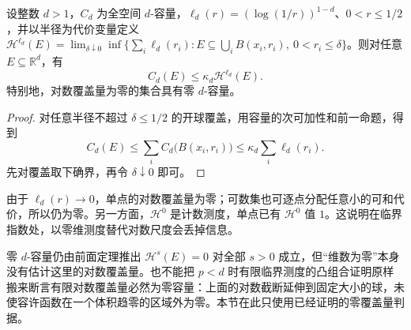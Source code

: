 \begin{corollary}\label{b1:cor:logarithmic-cover-zero-capacity}
设整数 \(d>1\)，\(C_d\) 为全空间 \(d\)-容量，\(\ell_d(r)=(\log(1/r))^{1-d}\)、\(0<r\leq1/2\)，并以半径为代价变量定义 \(\mathcal H^{\ell_d}(E)=\lim_{\delta\downarrow0}\inf\{\sum_i\ell_d(r_i):E\subseteq\bigcup_iB(x_i,r_i),\ 0<r_i\leq\delta\}\)。则对任意 \(E\subseteq\mathbb R^d\)，有
\[
 C_d(E)\leq\kappa_d\mathcal H^{\ell_d}(E).
\]
特别地，对数覆盖量为零的集合具有零 \(d\)-容量。
\end{corollary}
\begin{proof}
对任意半径不超过 \(\delta\leq1/2\) 的开球覆盖，用容量的次可加性和前一命题，得到
\[
 C_d(E)\leq\sum_iC_d\bigl(B(x_i,r_i)\bigr)
 \leq\kappa_d\sum_i\ell_d(r_i).
\]
先对覆盖取下确界，再令 \(\delta\downarrow0\) 即可。
\end{proof}

由于 \(\ell_d(r)\to0\)，单点的对数覆盖量为零；可数集也可逐点分配任意小的可和代价，所以仍为零。另一方面，\(\mathcal H^0\) 是计数测度，单点已有 \(\mathcal H^0\) 值 \(1\)。这说明在临界指数处，以零维测度替代对数尺度会丢掉信息。

\ProseParagraphBreak

零 \(d\)-容量仍由前面定理推出 \(\mathcal H^s(E)=0\) 对全部 \(s>0\) 成立，但“维数为零”本身没有估计这里的对数覆盖量。也不能把 \(p<d\) 时有限临界测度的凸组合证明原样搬来断言有限对数覆盖量必然为零容量：上面的对数截断延伸到固定大小的球，未使容许函数在一个体积趋零的区域外为零。本节在此只使用已经证明的零覆盖量判据。
